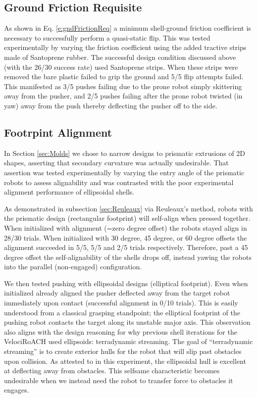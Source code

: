 \documentclass[letterpaper]{report}
\begin{document}
\subsection{Ground Friction Requisite}
As shown in Eq. \ref{e:gndFrictionReq} a minimum shell-ground friction coefficient is necessary to successfully perform a quasi-static flip.
This was tested experimentally by varying the friction coefficient using the added tractive strips made of Santoprene rubber.
The successful design condition discussed above (with the 26/30 success rate) used Santoprene strips.
When these strips were removed the bare plastic failed to grip the ground and 5/5 flip attempts failed.
This manifested as 3/5 pushes failing due to the prone robot simply skittering away from the pusher, and 2/5 pushes failing after the prone robot twisted (in yaw) away from the push thereby deflecting the pusher off to the side.

\subsection{Footrpint Alignment}
In Section \ref{sec:Molds} we chose to narrow designs to prismatic extrusions of 2D shapes, asserting that secondary curvature was actually undesirable.
That assertion was tested experimentally by varying the entry angle of the prismatic robots to assess alignability and was contrasted with the poor experimental alignment performance of ellipsoidal shells.

As demonstrated in subsection \ref{sec:Reuleaux} via Reuleaux's method, robots with the prismatic design (rectangular footprint) will self-align when pressed together.
When initialized with alignment (=zero degree offset) the robots stayed align in 28/30 trials.
When initialized with 30 degree, 45 degree, or 60 degree offsets the alignment succeeded in 5/5, 5/5 and 2/5 trials respectively.
Therefore, past a 45 degree offset the self-alignability of the shells drops off, instead yawing the robots into the parallel (non-engaged) configuration.

We then tested pushing with ellipsoidal designs (elliptical footprint).
Even when initialized already aligned the pusher deflected away from the target robot immediately upon contact (successful alignment in 0/10 trials).
This is easily understood from a classical grasping standpoint; the elliptical footprint of the pushing robot contacts the target along its unstable major axis.
This observation also aligns with the design reasoning for why previous shell iterations for the VelociRoACH used ellipsoids: terradynamic streaming.
The goal of ``terradynamic streaming'' is to create exterior hulls for the robot that will slip past obstacles upon collision.
As attested to in this experiment, the ellipsoidal hull is excellent at deflecting away from obstacles.
This selfsame characteristic becomes undesirable when we instead need the robot to transfer force to obstacles it engages.
\end{document}
